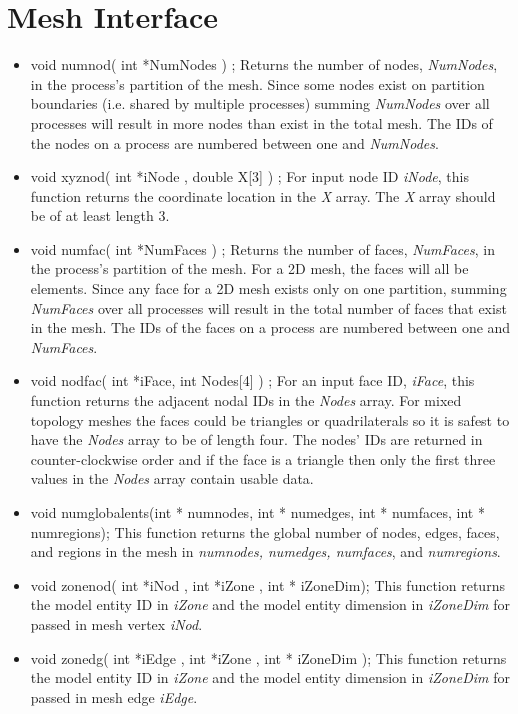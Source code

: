 \section{Mesh Interface}
\begin{itemize}
\item void numnod( int *NumNodes ) ; Returns the number of nodes, \textit{NumNodes}, in the process's partition of the mesh.  Since
 some nodes  exist on partition boundaries (i.e. shared by multiple processes) summing \textit{NumNodes} over all
processes will result in more nodes than exist in the total mesh. The IDs of the nodes on a process are numbered between
one and \textit{NumNodes}.
\item void xyznod( int *iNode , double X[3] ) ; For input node ID \textit{iNode}, this function returns the coordinate location in 
the \textit{X} array.  The \textit{X} array should be of at least length 3.
\item void numfac( int *NumFaces ) ; Returns the number of faces, \textit{NumFaces}, in the process's partition of the mesh. 
For a 2D mesh, the faces will all be elements. Since
 any face for a 2D mesh  exists only on  one partition,  summing \textit{NumFaces} over all
processes will result in the total number of faces that exist in the mesh. The IDs of the faces on a process are numbered between
one and \textit{NumFaces}.
\item void nodfac( int *iFace, int Nodes[4] ) ; For an input face ID, \textit{iFace}, this function returns the adjacent nodal IDs
in the \textit{Nodes} array.  
For mixed topology meshes the faces could be triangles or quadrilaterals so it is safest to have the \textit{Nodes} array to be of
length four.  The nodes' IDs are returned in counter-clockwise order and if the face is a triangle then only the first three
values in the \textit{Nodes} array contain usable data.
\item void numglobalents(int * numnodes, int * numedges, int * numfaces, int * numregions); This function returns
the global number of nodes, edges, faces, and regions in the mesh in \textit{numnodes, numedges, numfaces}, and \textit{numregions}.
\item  void zonenod( int *iNod , int *iZone , int * iZoneDim); This function returns the model entity ID in 
\textit{iZone} and the model entity dimension in \textit{iZoneDim} for passed in mesh vertex \textit{iNod}.
\item void zonedg( int *iEdge , int *iZone , int * iZoneDim ); This function returns the model entity ID in 
\textit{iZone} and the model entity dimension in \textit{iZoneDim} for passed in mesh edge \textit{iEdge}.


\end{itemize}
